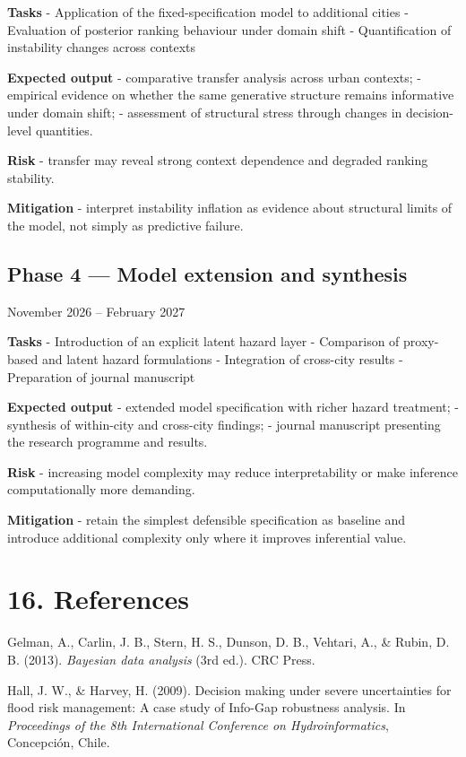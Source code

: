 \documentclass[
]{article}
\begin{document}
\textbf{Tasks} - Application of the fixed-specification model to
additional cities - Evaluation of posterior ranking behaviour under
domain shift - Quantification of instability changes across contexts

\textbf{Expected output} - comparative transfer analysis across urban
contexts; - empirical evidence on whether the same generative structure
remains informative under domain shift; - assessment of structural
stress through changes in decision-level quantities.

\textbf{Risk} - transfer may reveal strong context dependence and
degraded ranking stability.

\textbf{Mitigation} - interpret instability inflation as evidence about
structural limits of the model, not simply as predictive failure.

\subsection{Phase 4 --- Model extension and
synthesis}\label{phase-4-model-extension-and-synthesis}

November 2026 -- February 2027

\textbf{Tasks} - Introduction of an explicit latent hazard layer -
Comparison of proxy-based and latent hazard formulations - Integration
of cross-city results - Preparation of journal manuscript

\textbf{Expected output} - extended model specification with richer
hazard treatment; - synthesis of within-city and cross-city findings; -
journal manuscript presenting the research programme and results.

\textbf{Risk} - increasing model complexity may reduce interpretability
or make inference computationally more demanding.

\textbf{Mitigation} - retain the simplest defensible specification as
baseline and introduce additional complexity only where it improves
inferential value.

\section{16. References}\label{references}

Gelman, A., Carlin, J. B., Stern, H. S., Dunson, D. B., Vehtari, A., \&
Rubin, D. B. (2013). \emph{Bayesian data analysis} (3rd ed.). CRC Press.

Hall, J. W., \& Harvey, H. (2009). Decision making under severe
uncertainties for flood risk management: A case study of Info-Gap
robustness analysis. In \emph{Proceedings of the 8th International
Conference on Hydroinformatics}, Concepción, Chile.
\end{document}
